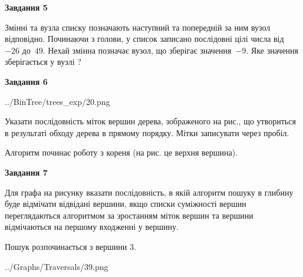 \documentclass[12pt, ukrainian]{article}
\begin{document}
{\begin {large}
{\begin {center}\textbf{Завдання 5}\end {center}}\par
Змінні  та  вузла списку позначають наступний та попередній за ним вузол відповідно. Починаючи з голови, у список записано послідовні цілі числа від~$-26$ до~$49$. Нехай змінна  позначає вузол, що зберігає значення~$-9$.
Яке значення зберігається у вузлі  ?\par
\newpage

{\begin {center}\textbf{Завдання 6}\end {center}}\par

\begin{center}
	{../BinTree/trees_exp/20.png}
\end{center}
Указати послідовність міток вершин дерева, зображеного на рис., що утвориться в результаті обходу дерева в прямому порядку. Мітки записувати через пробіл.\par Алгоритм починає роботу з кореня (на рис. це верхня вершина).\par
\newpage

{\begin {center}\textbf{Завдання 7}\end {center}}\par
Для графа на рисунку вказати послідовність, в якій алгоритм пошуку в глибину буде відмічати відвідані вершини, якщо списки суміжності вершин переглядаються алгоритмом за зростанням міток вершин та вершини відмічаються на першому вход\-женні у вершину.\par
Пошук розпочинається з вершини 3.\par

\begin{center}
	{../Graphs/Traversals/39.png}
\end{center}\par
\newpage


\end{large}}
\end{document}
